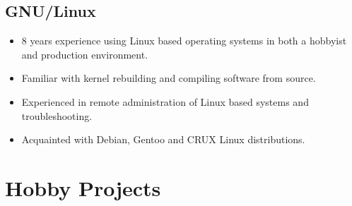 \documentclass[]{friggeri-cv}
\begin{document}
\subsection{GNU/Linux}
\begin{itemize}
    \item 8 years experience using Linux based operating systems in both a hobbyist and production environment.
    \item Familiar with kernel rebuilding and compiling software from source.
    \item Experienced in remote administration of Linux based systems and troubleshooting.
    \item Acquainted with Debian, Gentoo and CRUX Linux distributions.
\end{itemize}

\section{Hobby Projects}

\begin{entrylist}
  \entry
    {}
    {}
    {}
    {}
\end{entrylist}
\end{document}

